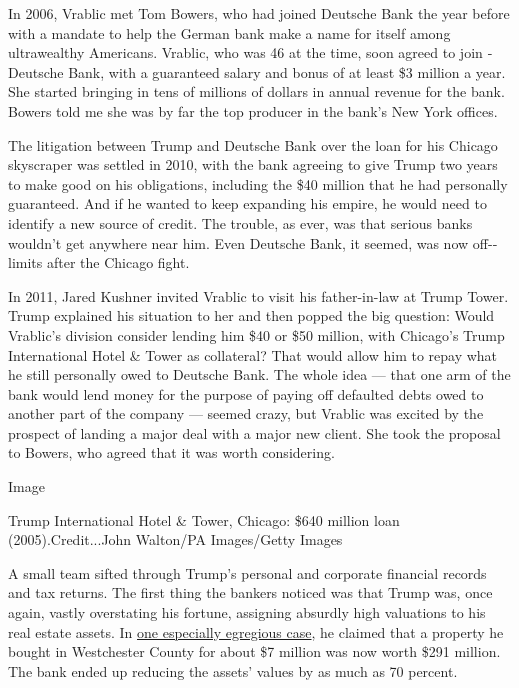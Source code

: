 In 2006, Vrablic met Tom Bowers, who had joined ­Deutsche Bank the year
before with a mandate to help the German bank make a name for itself
among ultrawealthy Americans. Vrablic, who was 46 at the time, soon
agreed to join ­Deutsche Bank, with a guaranteed salary and bonus of at
least \$3 million a year. She started bringing in tens of millions of
dollars in annual revenue for the bank. Bowers told me she was by far
the top producer in the bank's New York offices.

The litigation between Trump and ­Deutsche Bank over the loan for his
Chicago skyscraper was settled in 2010, with the bank agreeing to give
Trump two years to make good on his obligations, including the \$40
million that he had personally guaranteed. And if he wanted to keep
expanding his empire, he would need to identify a new source of credit.
The trouble, as ever, was that serious banks wouldn't get anywhere near
him. Even ­Deutsche Bank, it seemed, was now off-­limits after the
Chicago fight.

In 2011, Jared Kushner invited Vrablic to visit his father-­in-­law at
Trump Tower. Trump explained his situation to her and then popped the
big question: Would Vrablic's division consider lending him \$40 or \$50
million, with Chicago's Trump International Hotel \& Tower as
collateral? That would allow him to repay what he still personally owed
­to Deutsche Bank. The whole idea --- that one arm of ­the bank would
lend money for the purpose of paying off defaulted debts owed to another
part of the company --- seemed crazy, but Vrablic was excited by the
prospect of landing a major deal with a major new client. She took the
proposal to Bowers, who agreed that it was worth considering.

Image

Trump International Hotel \& Tower, Chicago: \$640 million loan
(2005).Credit...John Walton/PA Images/Getty Images

A small team sifted through Trump's personal and corporate financial
records and tax returns. The first thing the bankers noticed was that
Trump was, once again, vastly overstating his fortune, assigning
absurdly high valuations to his real estate assets. In
\href{https://www.nytimes3xbfgragh.onion/2019/02/27/business/donald-trump-buffalo-bills-deutsche-bank.html}{one
especially egregious case}, he claimed that a property he bought in
Westchester County for about \$7 million was now worth \$291 million.
The bank ended up reducing the assets' values by as much as 70 percent.

